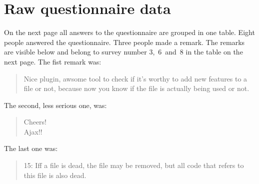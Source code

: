 \chapter{Raw questionnaire data}
On the next page all answers to the questionnaire are grouped in one table. Eight people answered the questionnaire.
Three people made a remark. The remarks are visible below and belong to survey number 3,~6~and~8 in the table on the next page. The fist remark was: 

\begin{quote}
  Nice plugin, awsome tool to check if it's worthy to add new features to a file or not, because now you know if the file is actually being used or not.
\end{quote}

\noindent The second, less serious one, was:

\begin{quote}
Cheers! \\
Ajax!!
\end{quote}

\noindent The last one was:

\begin{quote}
	15: Iff a file is dead, the file may be removed, but all code that refers to this file is also dead.
\end{quote}

